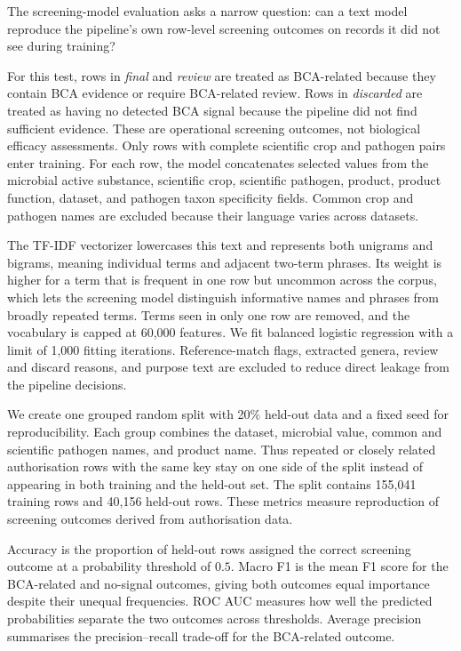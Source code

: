 The screening-model evaluation asks a narrow question: can a text model reproduce the pipeline's own row-level screening outcomes on records it did not see during training?

For this test, rows in \textit{final} and \textit{review} are treated as BCA-related because they contain BCA evidence or require BCA-related review.
Rows in \textit{discarded} are treated as having no detected BCA signal because the pipeline did not find sufficient evidence.
These are operational screening outcomes, not biological efficacy assessments.
Only rows with complete scientific crop and pathogen
pairs enter training. For each row, the model concatenates selected values from the microbial active substance,
scientific crop, scientific pathogen, product, product function, dataset, and pathogen taxon specificity fields.
Common crop and pathogen names are excluded because their language varies across datasets.

The TF-IDF vectorizer lowercases this text and represents both unigrams and bigrams, meaning individual terms and
adjacent two-term phrases. Its weight is higher for a term that is frequent in one row but uncommon across the
corpus, which lets the screening model distinguish informative names and phrases from broadly repeated terms. Terms seen
in only one row are removed, and the vocabulary is capped at 60,000 features. We fit balanced logistic regression with
a limit of 1,000 fitting iterations. Reference-match flags, extracted genera, review
and discard reasons, and purpose text are excluded to reduce direct leakage from the pipeline decisions.

We create one grouped random split with 20\% held-out data and a fixed seed for reproducibility. Each group combines the
dataset, microbial value, common and scientific pathogen names, and product name. Thus repeated or
closely related authorisation rows with the same key stay on one side of the split instead of appearing in both
training and the held-out set. The split contains 155,041 training rows and 40,156 held-out rows. These metrics measure
reproduction of screening outcomes derived from authorisation data.

Accuracy is the proportion of held-out rows assigned the correct screening outcome at a probability threshold of $0.5$.
Macro F1 is the mean F1 score for the BCA-related and no-signal outcomes, giving both outcomes equal importance despite their
unequal frequencies. ROC AUC measures how well the predicted probabilities separate the two outcomes across thresholds.
Average precision summarises the precision--recall trade-off for the BCA-related outcome.

